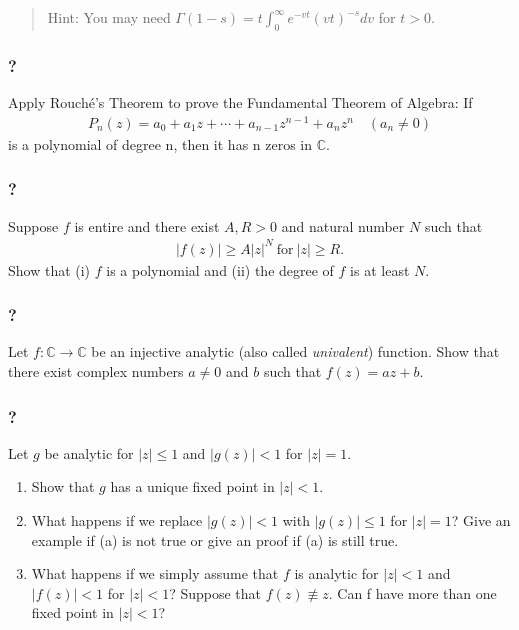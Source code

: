\begin{quote}
Hint: You may need
\(\displaystyle{\Gamma(1-s)=t \int_0^{\infty}e^{-vt}(vt)^{-s} dv}\) for
\(t>0\).
\end{quote}

\hypertarget{section-89}{%
\subsubsection{?}\label{section-89}}

Apply Rouché's Theorem to prove the Fundamental Theorem of Algebra: If
\begin{align*}P_n(z) = a_0 + a_1z + \cdots + a_{n-1}z^{n-1} + a_nz^n\quad  (a_n \neq 0)\end{align*}
is a polynomial of degree n, then it has n zeros in \(\mathbb C\).

\hypertarget{section-90}{%
\subsubsection{?}\label{section-90}}

Suppose \(f\) is entire and there exist \(A, R >0\) and natural number
\(N\) such that
\begin{align*}|f(z)| \geq A |z|^N\ \text{for}\ |z| \geq R.\end{align*}
Show that (i) \(f\) is a polynomial and (ii) the degree of \(f\) is at
least \(N\).

\hypertarget{section-91}{%
\subsubsection{?}\label{section-91}}

Let \(f: {\mathbb C} \rightarrow {\mathbb C}\) be an injective analytic
(also called \emph{univalent}) function. Show that there exist complex
numbers \(a \neq 0\) and \(b\) such that \(f(z) = az + b\).

\hypertarget{section-92}{%
\subsubsection{?}\label{section-92}}

Let \(g\) be analytic for \(|z|\leq 1\) and \(|g(z)| < 1\) for
\(|z| = 1\).

\begin{enumerate}
\def\labelenumi{\arabic{enumi}.}
\item
  Show that \(g\) has a unique fixed point in \(|z| < 1\).
\item
  What happens if we replace \(|g(z)| < 1\) with \(|g(z)|\leq 1\) for
  \(|z|=1\)? Give an example if (a) is not true or give an proof if (a)
  is still true.
\item
  What happens if we simply assume that \(f\) is analytic for
  \(|z| < 1\) and \(|f(z)| < 1\) for \(|z| < 1\)? Suppose that
  \(f(z) \not\equiv z\). Can f have more than one fixed point in
  \(|z| < 1\)?
\end{enumerate}

